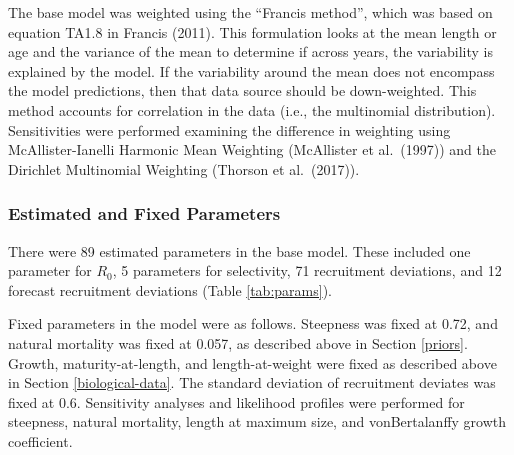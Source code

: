 \documentclass[11pt,
  english,
  a4paper,
]{article}
\begin{document}

The base model was weighted using the ``Francis method'', which was based on equation TA1.8 in Francis {(2011)\leavevmode\tagmcend\tagstructend}. This formulation looks at the mean length or age and the variance of the mean to determine if across years, the variability is explained by the model. If the variability around the mean does not encompass the model predictions, then that data source should be down-weighted. This method accounts for correlation in the data (i.e., the multinomial distribution). Sensitivities were performed examining the difference in weighting using McAllister-Ianelli Harmonic Mean Weighting (McAllister et al.~{(1997)\leavevmode\tagmcend\tagstructend}) and the Dirichlet Multinomial Weighting (Thorson et al.~{(2017)\leavevmode\tagmcend\tagstructend}).

\leavevmode\tagmcend\tagstructend\par


\hypertarget{estimated-and-fixed-parameters}{%
\subsubsection{Estimated and Fixed Parameters}\label{estimated-and-fixed-parameters}}

\leavevmode\tagmcend\tagstructend


There were 89 estimated parameters in the base model. These included one parameter for {\(R_0\)\leavevmode\tagmcend\tagstructend}, 5 parameters for selectivity, 71 recruitment deviations, and 12 forecast recruitment deviations (Table \ref{tab:params}).

\leavevmode\tagmcend\tagstructend\par


Fixed parameters in the model were as follows. Steepness was fixed at 0.72, and natural mortality was fixed at 0.057, as described above in Section \ref{priors}. Growth, maturity-at-length, and length-at-weight were fixed as described above in Section \ref{biological-data}. The standard deviation of recruitment deviates was fixed at 0.6. Sensitivity analyses and likelihood profiles were performed for steepness, natural mortality, length at maximum size, and vonBertalanffy growth coefficient.
\end{document}

